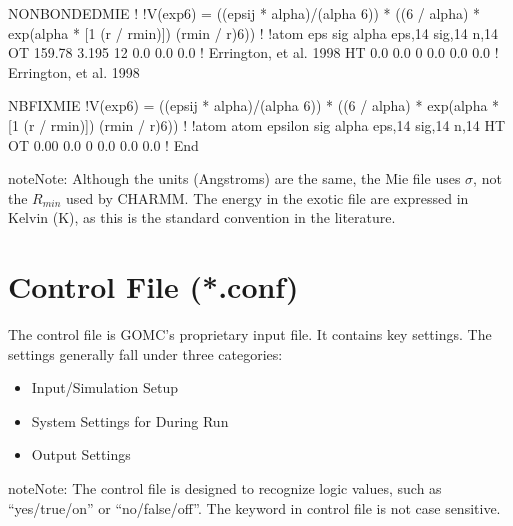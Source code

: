 \documentclass[letterpaper,10pt,english]{sphinxmanual}
\begin{document}
\begin{sphinxVerbatim}[commandchars=\\\{\}]
NONBONDED\PYGZus{}MIE
!
!V(exp\PYGZhy{}6) = ((eps\PYGZhy{}ij * alpha)/(alpha \PYGZhy{} 6)) * ((6 / alpha) * exp(alpha * [1 \PYGZhy{} (r / rmin)]) \PYGZhy{} (rmin / r)\PYGZca{}6))
!
!atom eps       sig     alpha     eps,1\PYGZhy{}4   sig,1\PYGZhy{}4   n,1\PYGZhy{}4
OT    159.78    3.195   12        0.0       0.0       0.0 ! Errington, et al. 1998
HT      0.0     0.0      0        0.0       0.0       0.0 ! Errington, et al. 1998

NBFIX\PYGZus{}MIE
!V(exp\PYGZhy{}6) = ((eps\PYGZhy{}ij * alpha)/(alpha \PYGZhy{} 6)) * ((6 / alpha) * exp(alpha * [1 \PYGZhy{} (r / rmin)]) \PYGZhy{} (rmin / r)\PYGZca{}6))
!
!atom atom  epsilon  sig     alpha     eps,1\PYGZhy{}4   sig,1\PYGZhy{}4   n,1\PYGZhy{}4
HT   OT      0.00    0.0     0         0.0       0.0       0.0 !
End
\end{sphinxVerbatim}

\begin{sphinxadmonition}{note}{Note:}
Although the units (Angstroms) are the same, the Mie file uses \(\sigma\), not the \(R_{min}\) used by CHARMM. The energy in the exotic file are expressed in Kelvin (K), as this is the standard convention in the literature.
\end{sphinxadmonition}


\section{Control File (*.conf)}
\label{\detokenize{input_file:control-file-conf}}
The control file is GOMC’s proprietary input file. It contains key settings. The settings generally fall under three categories:
\begin{itemize}
\item {} 
Input/Simulation Setup

\item {} 
System Settings for During Run

\item {} 
Output Settings

\end{itemize}

\begin{sphinxadmonition}{note}{Note:}
The control file is designed to recognize logic values, such as “yes/true/on” or “no/false/off”. The keyword in control file is not case sensitive.
\end{sphinxadmonition}
\end{document}
